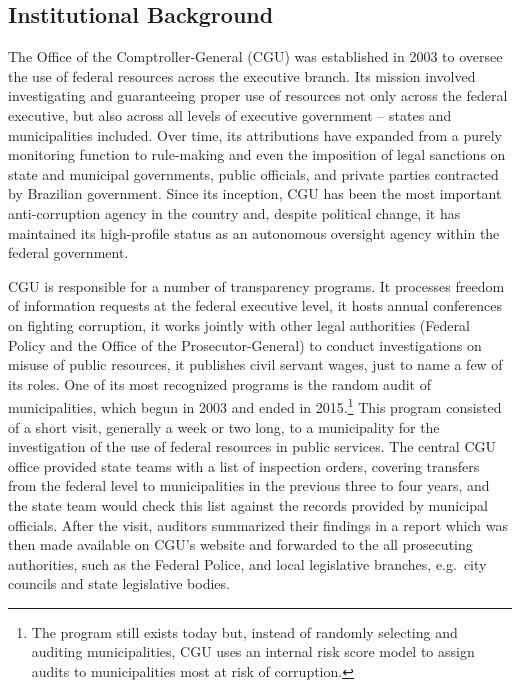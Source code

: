 \documentclass[11pt]{article}
\begin{document}
\subsection{Institutional Background} \label{subsec:background_paper3}

The Office of the Comptroller-General (CGU) was established in 2003 to oversee the use of federal resources across the executive branch. Its mission involved investigating and guaranteeing proper use of resources not only across the federal executive, but also across all levels of executive government -- states and municipalities included. Over time, its attributions have expanded from a purely monitoring function to rule-making and even the imposition of legal sanctions on state and municipal governments, public officials, and private parties contracted by Brazilian government. Since its inception, CGU has been the most important anti-corruption agency in the country and, despite political change, it has maintained its high-profile status as an autonomous oversight agency within the federal government.

CGU is responsible for a number of transparency programs. It processes freedom of information requests at the federal executive level, it hosts annual conferences on fighting corruption, it works jointly with other legal authorities (Federal Policy and the Office of the Prosecutor-General) to conduct investigations on misuse of public resources, it publishes civil servant wages, just to name a few of its roles. One of its most recognized programs is the random audit of municipalities, which begun in 2003 and ended in 2015.\footnote{The program still exists today but, instead of randomly selecting and auditing municipalities, CGU uses an internal risk score model to assign audits to municipalities most at risk of corruption.} This program consisted of a short visit, generally a week or two long, to a municipality for the investigation of the use of federal resources in public services. The central CGU office provided state teams with a list of inspection orders, covering transfers from the federal level to municipalities in the previous three to four years, and the state team would check this list against the records provided by municipal officials. After the visit, auditors summarized their findings in a report which was then made available on CGU's website and forwarded to the all prosecuting authorities, such as the Federal Police, and local legislative branches, e.g.~city councils and state legislative bodies.
\end{document}

